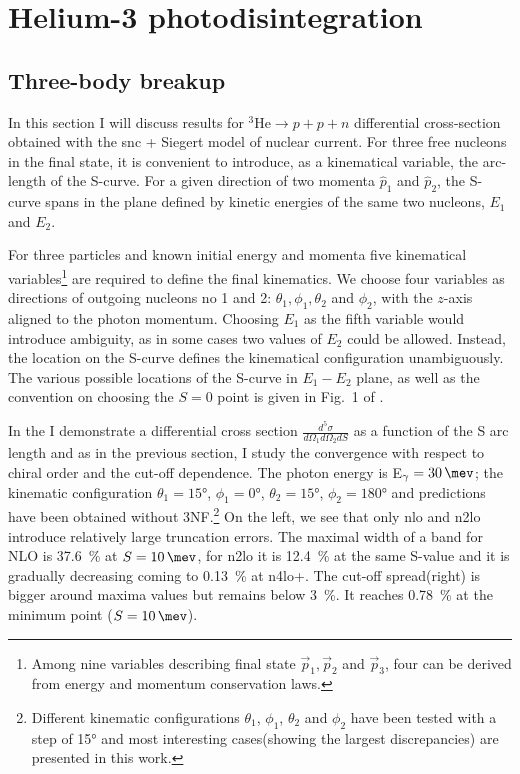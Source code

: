 \clearpage

\section{Helium-3 photodisintegration}
\label{sec:hel_results}

\subsection{Three-body breakup}
\label{sec:hel_3N}

    In this section I will discuss results
    for $^3\text{He} \rightarrow p + p + n$ differential
    cross-section obtained with the \gls{snc} + Siegert model of nuclear current.
    For three free nucleons in the final state, it is convenient to
    introduce, as a kinematical variable, the arc-length of the S-curve.
    For a given direction of two momenta $\hat{p}_1$ and $\hat{p}_2$,
    the S-curve spans in the plane defined by kinetic energies of the 
    same two nucleons, $E_1$ and $E_2$.

    For three particles and known initial energy and momenta five kinematical
    variables\footnote{Among nine variables describing final state 
    $\vec{p}_1,\vec{p}_2$ and $\vec{p}_3$, four can be derived from 
    energy and momentum conservation laws.}
    are required to define the final kinematics.
    We choose four variables as directions of outgoing nucleons no 1 and 2:
    $\theta_1, \phi_1, \theta_2$ and $\phi_2$, with the $z$-axis aligned to the 
    photon momentum. Choosing $E_1$ as the fifth variable would introduce
    ambiguity, as in some cases two values of $E_2$ could be allowed.
    Instead, the location on the S-curve defines the kinematical configuration
    unambiguously.
    The various possible locations of the S-curve in $E_1-E_2$ plane,
    as well as the convention on choosing the $S=0$ point is given
    in Fig.~1 of \cite{GLOCKLE_report_1996}.
    
    In the  I demonstrate a differential cross section 
    $\frac{d^5\sigma}{d\Omega_1d\Omega_2dS}$ as a function of the S arc length
    and as in the previous section, I study the convergence with respect to chiral
    order and the cut-off dependence.
    The photon energy is  E$_\gamma=\SI{30}{\mev}$; the kinematic configuration
    $\theta_1 = \ang{15}$, $\phi_1 = \ang{0}$,
    $\theta_2 = \ang{15}$, $\phi_2 = \ang{180}$ and predictions have been
    obtained without 3NF.\footnote{Different kinematic configurations $\theta_1$, $\phi_1$,
    $\theta_2$ and $\phi_2$ have been tested with a step of \ang{15}
    and most interesting cases(showing the largest discrepancies) are presented in this work.}
    On the left, we see that only \gls{nlo} and \gls{n2lo} introduce relatively large truncation errors.
    The maximal width of a band for NLO is \SI{37.6}{\percent} at $S=\SI{10}{\mev}$,
    for \gls{n2lo} it is \SI{12.4}{\percent} at the same S-value and it is gradually decreasing
    coming to \SI{0.13}{\percent} at \gls{n4lo+}.
    The cut-off spread(right) is bigger around maxima values but remains below
    \SI{3}{\percent}. It reaches
    \SI{0.78}{\percent} at the minimum point ($S=\SI{10}{\mev}$).
    

